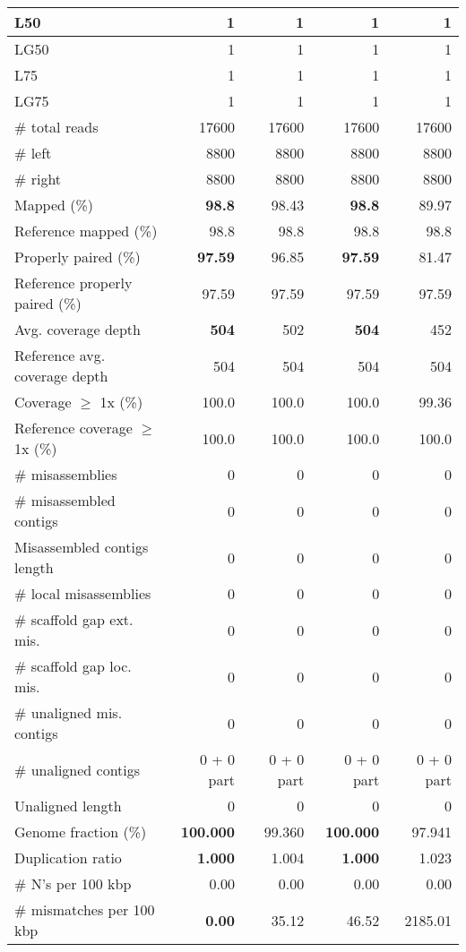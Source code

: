 \documentclass[12pt,a4paper]{article}
\begin{document}
\begin{table}[ht]
\begin{center}
\begin{tabular}{|l*{4}{|r}|}
L50 & 1 & 1 & 1 & 1 \\ \hline
LG50 & 1 & 1 & 1 & 1 \\ \hline
L75 & 1 & 1 & 1 & 1 \\ \hline
LG75 & 1 & 1 & 1 & 1 \\ \hline
\# total reads & 17600 & 17600 & 17600 & 17600 \\ \hline
\# left & 8800 & 8800 & 8800 & 8800 \\ \hline
\# right & 8800 & 8800 & 8800 & 8800 \\ \hline
Mapped (\%) & {\bf 98.8} & 98.43 & {\bf 98.8} & 89.97 \\ \hline
Reference mapped (\%) & 98.8 & 98.8 & 98.8 & 98.8 \\ \hline
Properly paired (\%) & {\bf 97.59} & 96.85 & {\bf 97.59} & 81.47 \\ \hline
Reference properly paired (\%) & 97.59 & 97.59 & 97.59 & 97.59 \\ \hline
Avg. coverage depth & {\bf 504} & 502 & {\bf 504} & 452 \\ \hline
Reference avg. coverage depth & 504 & 504 & 504 & 504 \\ \hline
Coverage $\geq$ 1x (\%) & 100.0 & 100.0 & 100.0 & 99.36 \\ \hline
Reference coverage $\geq$ 1x (\%) & 100.0 & 100.0 & 100.0 & 100.0 \\ \hline
\# misassemblies & 0 & 0 & 0 & 0 \\ \hline
\# misassembled contigs & 0 & 0 & 0 & 0 \\ \hline
Misassembled contigs length & 0 & 0 & 0 & 0 \\ \hline
\# local misassemblies & 0 & 0 & 0 & 0 \\ \hline
\# scaffold gap ext. mis. & 0 & 0 & 0 & 0 \\ \hline
\# scaffold gap loc. mis. & 0 & 0 & 0 & 0 \\ \hline
\# unaligned mis. contigs & 0 & 0 & 0 & 0 \\ \hline
\# unaligned contigs & 0 + 0 part & 0 + 0 part & 0 + 0 part & 0 + 0 part \\ \hline
Unaligned length & 0 & 0 & 0 & 0 \\ \hline
Genome fraction (\%) & {\bf 100.000} & 99.360 & {\bf 100.000} & 97.941 \\ \hline
Duplication ratio & {\bf 1.000} & 1.004 & {\bf 1.000} & 1.023 \\ \hline
\# N's per 100 kbp & 0.00 & 0.00 & 0.00 & 0.00 \\ \hline
\# mismatches per 100 kbp & {\bf 0.00} & 35.12 & 46.52 & 2185.01 \\ \hline

\end{tabular}
\end{center}
\end{table}
\end{document}
